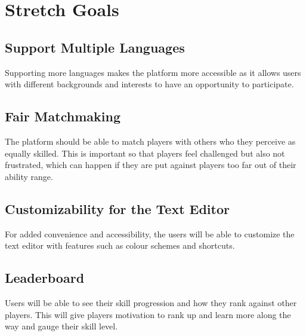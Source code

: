 \documentclass{article}
\begin{document}
\section{Stretch Goals}

\subsection{Support Multiple Languages}
Supporting more languages makes the platform more accessible as it allows users with different backgrounds and interests to have an opportunity to participate.

\subsection{Fair Matchmaking}
The platform should be able to match players with others who they perceive as equally skilled. This is important so that players feel challenged but also not frustrated, which can happen if they are put against players too far out of their ability range.

\subsection{Customizability for the Text Editor}
For added convenience and accessibility, the users will be able to customize the text editor with features such as colour schemes and shortcuts.

\subsection{Leaderboard}
Users will be able to see their skill progression and how they rank against other players. This will give players motivation to rank up and learn more along the way and gauge their skill level.
\end{document}
